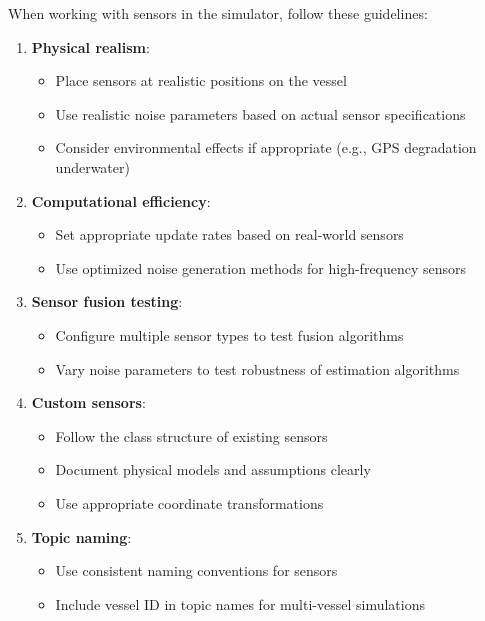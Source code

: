 \documentclass[
  letterpaper,
  DIV=11,
  numbers=noendperiod]{scrreprt}
\providecommand{\tightlist}{%
  \setlength{\itemsep}{0pt}\setlength{\parskip}{0pt}}\usepackage{longtable,booktabs,array}
\begin{document}

When working with sensors in the simulator, follow these guidelines:

\begin{enumerate}
\def\labelenumi{\arabic{enumi}.}
\item
  \textbf{Physical realism}:

  \begin{itemize}
  \tightlist
  \item
    Place sensors at realistic positions on the vessel
  \item
    Use realistic noise parameters based on actual sensor specifications
  \item
    Consider environmental effects if appropriate (e.g., GPS degradation
    underwater)
  \end{itemize}
\item
  \textbf{Computational efficiency}:

  \begin{itemize}
  \tightlist
  \item
    Set appropriate update rates based on real-world sensors
  \item
    Use optimized noise generation methods for high-frequency sensors
  \end{itemize}
\item
  \textbf{Sensor fusion testing}:

  \begin{itemize}
  \tightlist
  \item
    Configure multiple sensor types to test fusion algorithms
  \item
    Vary noise parameters to test robustness of estimation algorithms
  \end{itemize}
\item
  \textbf{Custom sensors}:

  \begin{itemize}
  \tightlist
  \item
    Follow the class structure of existing sensors
  \item
    Document physical models and assumptions clearly
  \item
    Use appropriate coordinate transformations
  \end{itemize}
\item
  \textbf{Topic naming}:

  \begin{itemize}
  \tightlist
  \item
    Use consistent naming conventions for sensors
  \item
    Include vessel ID in topic names for multi-vessel simulations
  \end{itemize}
\end{enumerate}
\end{document}
